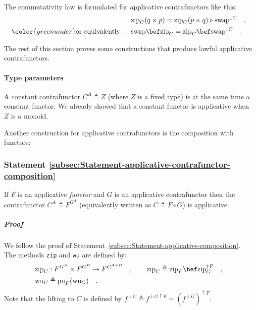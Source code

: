 The commutativity law is formulated for applicative contrafunctors
like this:
\begin{align*}
 & \text{zip}_{C}(q\times p)=\text{zip}_{C}(p\times q)\triangleright\text{swap}^{\downarrow C}\quad,\\
{\color{greenunder}\text{or equivalently}:}\quad & \text{swap}\bef\text{zip}_{C}=\text{zip}_{C}\bef\text{swap}^{\downarrow C}\quad.
\end{align*}

The rest of this section proves some constructions that produce lawful
applicative contrafunctors.

\paragraph{Type parameters}

A constant contrafunctor $C^{A}\triangleq Z$ (where $Z$ is a fixed
type) is at the same time a constant functor. We already showed that
a constant functor is applicative when $Z$ is a monoid. 

Another construction for applicative contrafunctors is the composition
with functors:

\subsubsection{Statement \label{subsec:Statement-applicative-contrafunctor-composition}\ref{subsec:Statement-applicative-contrafunctor-composition}}

If $F$ is an applicative \emph{functor} and $G$ is an applicative
contrafunctor then the contrafunctor $C^{A}\triangleq F^{G^{A}}$
(equivalently written as $C\triangleq F\circ G$) is applicative.

\subparagraph{Proof}

We follow the proof of Statement~\ref{subsec:Statement-applicative-composition}.
The methods \lstinline!zip! and \lstinline!wu! are defined by:
\begin{align*}
 & \text{zip}_{C}:F^{G^{A}}\times F^{G^{B}}\rightarrow F^{G^{A\times B}}\quad,\quad\quad\text{zip}_{C}\triangleq\text{zip}_{F}\bef\text{zip}_{G}^{\uparrow F}\quad,\\
 & \text{wu}_{C}\triangleq\text{pu}_{F}(\text{wu}_{G})\quad.
\end{align*}
Note that the lifting to $C$ is defined by $f^{\downarrow C}\triangleq f^{\downarrow G\uparrow F}=(f^{\downarrow G})^{\uparrow F}$. 

